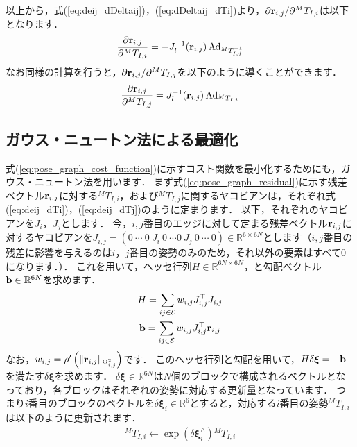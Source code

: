 以上から，式(\ref{eq:deij_dDeltaij})，(\ref{eq:dDeltaij_dTi})より，$\partial {\bf r}_{i, j} / \partial {}^{M}T_{I, i}$は以下となります．
%
\begin{align}
  \frac{ \partial {\bf r}_{i, j} }{ \partial {}^{M}T_{I, i} } = -J_{l}^{-1}( {\bf r}_{i, j} ) \operatorname{Ad}_{ {}^{M}T_{I, j}^{-1} }
  \label{eq:deij_dTi}
\end{align}
%
なお同様の計算を行うと，$\partial {\bf r}_{i, j} / \partial {}^{M}T_{I, j}$を以下のように導くことができます．
%
\begin{align}
  \frac{ \partial {\bf r}_{i, j} }{ \partial {}^{M}T_{I, j} } = J_{l}^{-1}( {\bf r}_{i, j} ) \operatorname{Ad}_{ {}^{M}T_{I, i} }
  \label{eq:deij_dTj}
\end{align}



\subsection{ガウス・ニュートン法による最適化}

式(\ref{eq:pose_graph_cost_function})に示すコスト関数を最小化するためにも，ガウス・ニュートン法を用います．
まず式(\ref{eq:pose_graph_residual})に示す残差ベクトル${\bf r}_{i, j}$に対する${}^{M}T_{I, i}$，および${}^{M}T_{I, j}$に関するヤコビアンは，それぞれ式(\ref{eq:deij_dTi})，(\ref{eq:deij_dTj})のように定まります．
以下，それぞれのヤコビアンを$J_{i}$，$J_{j}$とします．
今，$i, j$番目のエッジに対して定まる残差ベクトル${\bf r}_{i, j}$に対するヤコビアンを$J_{i, j} = \left( 0 ~ \cdots ~ 0 ~ J_{i} ~ 0 ~ \cdots 0 ~ J_{j} ~ 0 ~ \cdots ~ 0 \right) \in \mathbb{R}^{6 \times 6N}$とします（$i, j$番目の残差に影響を与えるのは$i$，$j$番目の姿勢のみのため，それ以外の要素はすべて0になります．）．
これを用いて，ヘッセ行列$H \in \mathbb{R}^{6N \times 6N}$，と勾配ベクトル${\bf b} \in \mathbb{R}^{6N}$を求めます．
%
\begin{align}
  \begin{gathered}
    H = \sum_{ ij \in \mathcal{E} } w_{i, j} J_{i, j}^{\top} J_{i, j} \\
    {\bf b} = \sum_{ ij \in \mathcal{E} } w_{i, j} J_{i, j}^{\top} {\bf r}_{i, j} \\
  \end{gathered}
  \label{eq:graph_slam_hessian_gradient}
\end{align}
%
なお，$w_{i, j} = \rho^{\prime} \left( \| {\bf r}_{i, j} \|_{ \Omega_{i, j}^{2} } \right)$です．
このヘッセ行列と勾配を用いて，$H \delta \boldsymbol \xi = -{\bf b}$を満たす$\delta \boldsymbol \xi$を求めます．
$\delta \boldsymbol \xi \in \mathbb{R}^{6N}$は$N$個のブロックで構成されるベクトルとなっており，各ブロックはそれぞれの姿勢に対応する更新量となっています．
つまり$i$番目のブロックのベクトルを$\delta \boldsymbol \xi_{i} \in \mathbb{R}^{6}$とすると，対応する$i$番目の姿勢${}^{M}T_{I, i}$は以下のように更新されます．
%
\begin{align}
  {}^{M}T_{I, i} \leftarrow \exp \left( \delta \boldsymbol \xi_{i}^{\wedge} \right) {}^{M}T_{I, i}
\end{align}
%

